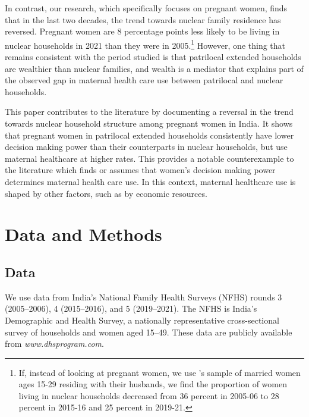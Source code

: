 \documentclass[10pt,twoside,reqno]{article}
\begin{document}
In contrast, our research, which specifically focuses on pregnant women, finds that in the last two decades, the trend towards nuclear family residence has reversed. Pregnant women are 8 percentage points less likely to be living in nuclear households in 2021 than they were in 2005.\footnote{If, instead of looking at pregnant women, we use \cite{allendorf2013going}'s sample of married women ages 15-29 residing with their husbands, we find the proportion of women living in nuclear households decreased from 36 percent in 2005-06 to 28 percent in 2015-16 and 25 percent in 2019-21.}  However, one thing that remains consistent with the period \cite{allendorf2013going} studied is that patrilocal extended households are wealthier than nuclear families, and wealth is a mediator that explains part of the observed gap in maternal health care use between patrilocal and nuclear households. 

This paper contributes to the literature by documenting a reversal in the trend towards nuclear household structure among pregnant women in India. It shows that pregnant women in patrilocal extended households consistently have lower decision making power than their counterparts in nuclear households, but use maternal healthcare at higher rates. This provides a notable counterexample to the literature which finds or assumes that women's decision making power determines maternal health care use.  In this context, maternal healthcare use is shaped by other factors, such as by economic resources.


\section{Data and Methods}\label{data_and_methods} %

\subsection{Data} \label{sec:data}

We use data from India’s National Family Health Surveys (NFHS) rounds 3 (2005–2006), 4 (2015–2016), and 5 (2019–2021). The NFHS is India’s Demographic and Health Survey, a nationally representative cross-sectional survey of households and women aged 15–49. These data are publicly available from \textit{www.dhsprogram.com}.
\end{document}
